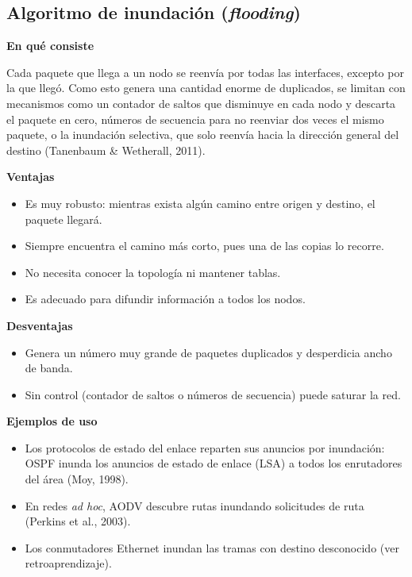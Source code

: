 \documentclass[12pt,letterpaper]{article}
\newcommand{\rub}[1]{\par\medskip\noindent\textbf{#1}\par\nopagebreak}
\begin{document}
\subsection{Algoritmo de inundación (\emph{flooding})}
\rub{En qué consiste}
Cada paquete que llega a un nodo se reenvía por todas las interfaces, excepto por la que llegó. Como esto genera una cantidad enorme de duplicados, se limitan con mecanismos como un contador de saltos que disminuye en cada nodo y descarta el paquete en cero, números de secuencia para no reenviar dos veces el mismo paquete, o la inundación selectiva, que solo reenvía hacia la dirección general del destino (Tanenbaum \& Wetherall, 2011).
\rub{Ventajas}
\begin{itemize}[itemsep=2pt]
\item Es muy robusto: mientras exista algún camino entre origen y destino, el paquete llegará.
\item Siempre encuentra el camino más corto, pues una de las copias lo recorre.
\item No necesita conocer la topología ni mantener tablas.
\item Es adecuado para difundir información a todos los nodos.
\end{itemize}
\rub{Desventajas}
\begin{itemize}[itemsep=2pt]
\item Genera un número muy grande de paquetes duplicados y desperdicia ancho de banda.
\item Sin control (contador de saltos o números de secuencia) puede saturar la red.
\end{itemize}
\rub{Ejemplos de uso}
\begin{itemize}[itemsep=2pt]
\item Los protocolos de estado del enlace reparten sus anuncios por inundación: OSPF inunda los anuncios de estado de enlace (LSA) a todos los enrutadores del área (Moy, 1998).
\item En redes \emph{ad hoc}, AODV descubre rutas inundando solicitudes de ruta (Perkins et al., 2003).
\item Los conmutadores Ethernet inundan las tramas con destino desconocido (ver retroaprendizaje).
\end{itemize}
\end{document}
